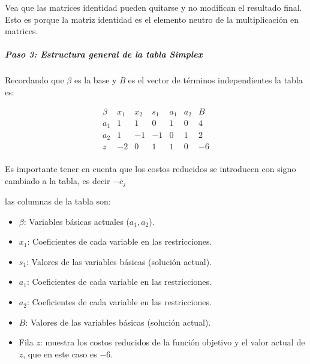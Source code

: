 \begin{tcolorbox}[myconclusion]
  Vea que las matrices identidad pueden quitarse y no modifican el resultado final. Esto es porque la matriz identidad es el elemento neutro de la multiplicación en matrices.
\end{tcolorbox}

\subparagraph{Paso 3: Estructura general de la tabla Simplex}

Recordando que \(\beta\) es la base y \textit{B} es el vector de términos independientes la tabla es:

\[
\begin{array}{c|cccccc|c}
\beta & x_1 & x_2 & s_1 & a_1 & a_2 & B \\
\hline
a_1 & 1 & 1 & 0 & 1 & 0 & 4 \\
a_2 & 1 & -1 & -1 & 0 & 1 & 2 \\
\hline
z & -2 & 0 & 1 & 1 & 0 & -6 \\
\end{array}
\]

\begin{tcolorbox}[danger_box, title=Prevención de Riesgos]
  Es importante tener en cuenta que los costos reducidos se introducen con signo cambiado a la tabla, es decir \(-\bar{c}_j\)
\end{tcolorbox}

\noindent las columnas de la tabla son:
\begin{itemize}
  \item \(\beta\): Variables básicas actuales (\(a_1, a_2\)).
  \item \(x_1\): Coeficientes de cada variable en las restricciones.
  \item \(s_1\): Valores de las variables básicas (solución actual).
  \item \(a_1\): Coeficientes de cada variable en las restricciones.
  \item \(a_2\): Coeficientes de cada variable en las restricciones.
  \item \(B\): Valores de las variables básicas (solución actual).
  \item Fila \(z\): muestra los costos reducidos de la función objetivo y el valor actual de \(z\), que en este caso es \(-6\).
\end{itemize}



